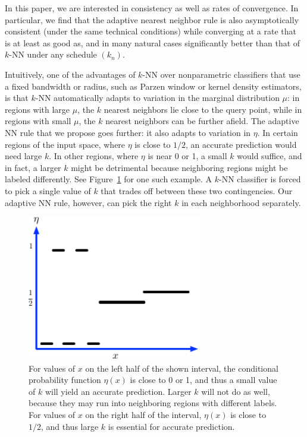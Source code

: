 \documentclass{article}
\begin{document}
In this paper, we are interested in consistency as well as rates of
convergence. In particular, we find that the adaptive nearest neighbor
rule is also asymptotically consistent (under the same technical
conditions) while converging at a rate that is at least as good as,
and in many natural cases significantly better than that of $k$-NN
under any schedule $(k_n)$.

Intuitively, one of the advantages of $k$-NN over nonparametric
classifiers that use a fixed bandwidth or radius, such as Parzen
window or kernel density estimators, is that $k$-NN automatically
adapts to variation in the marginal distribution $\mu$: in regions
with large $\mu$, the $k$ nearest neighbors lie close to the query
point, while in regions with small $\mu$, the $k$ nearest neighbors
can be further afield. The adaptive NN rule that we propose goes
further: it also adapts to variation in $\eta$. In certain regions of
the input space, where $\eta$ is close to $1/2$, an accurate
prediction would need large $k$. In other regions, where $\eta$ is
near 0 or 1, a small $k$ would suffice, and in fact, a larger $k$
might be detrimental because neighboring regions might be labeled
differently. See Figure~\ref{fig:rationale} for one such example. A
$k$-NN classifier is forced to pick a single value of $k$ that trades
off between these two contingencies. Our adaptive NN rule, however,
can pick the right $k$ in each neighborhood separately.

\begin{figure}
\begin{center}
\includegraphics[width=3in]{adaptive-rationale.pdf}
\end{center}
\caption{For values of $x$ on the left half of the shown interval, the conditional probability function $\eta(x)$ is close to 0 or 1, and thus a small value of $k$ will yield an accurate prediction. Larger $k$ will not do as well, because they may run into neighboring regions with different labels. For values of $x$ on the right half of the interval, $\eta(x)$ is close to $1/2$, and thus large $k$ is essential for accurate prediction.}
\label{fig:rationale}
\end{figure}
\end{document}
